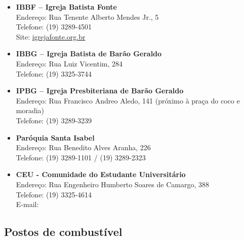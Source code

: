 \begin{itemize}
    \item   \textbf{IBBF -- Igreja Batista Fonte}
        \\Endereço: Rua Tenente Alberto Mendes Jr., 5
        \\Telefone: (19) 3289-4501
        \\Site: \url{igrejafonte.org.br}

    \item   \textbf{IBBG -- Igreja Batista de Barão Geraldo}
        \\Endereço: Rua Luiz Vicentim, 284
        \\Telefone: (19) 3325-3744

    \item   \textbf{IPBG -- Igreja Presbiteriana de Barão Geraldo}
        \\Endereço: Rua Francisco Andreo Aledo, 141 (próximo à praça do coco e
        moradia)
        \\Telefone: (19) 3289-3239

    \item   \textbf{Paróquia Santa Isabel}
        \\Endereço: Rua Benedito Alves Aranha, 226
        \\Telefone: (19) 3289-1101 / (19) 3289-2323

    \item   \textbf{CEU - Comunidade do Estudante Universitário}
        \\Endereço: Rua Engenheiro Humberto Soares de Camargo, 388
        \\Telefone: (19) 3325-4614
        \\E-mail: 
\end{itemize}

\subsection{Postos de combustível}

